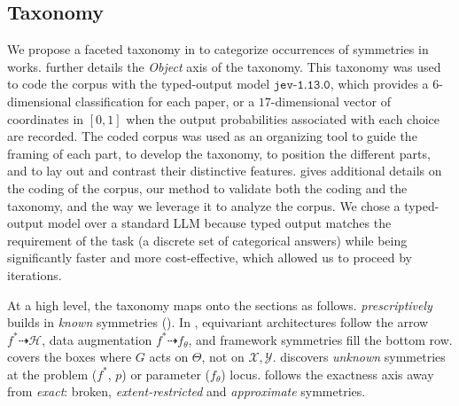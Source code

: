 \documentclass[mathematics,review,submit,moreauthors]{Definitions/mdpi}
\begin{document}
\subsection{Taxonomy}
We propose a faceted taxonomy in  to categorize occurrences of symmetries in works.
 further details the \emph{Object} axis of the taxonomy.
This taxonomy was used to code the corpus with the typed-output model $\texttt{jev-1.13.0}$, which provides a $6$-dimensional classification for each paper, or a $17$-dimensional vector of coordinates in $[0,1]$ when the output probabilities associated with each choice are recorded.
The coded corpus was used as an organizing tool to guide the framing of each part, to develop the taxonomy, to position the different parts, and to lay out and contrast their distinctive features.
 gives additional details on the coding of the corpus, our method to validate both the coding and the taxonomy, and the way we leverage it to analyze the corpus.
We chose a typed-output model over a standard LLM because typed output matches the requirement of the task (a discrete set of categorical answers) while being significantly faster and more cost-effective, which allowed us to proceed by iterations.

At a high level, the taxonomy maps onto the sections as follows.
 \emph{prescriptively} builds in \emph{known} symmetries ().
In , equivariant architectures follow the arrow $f^*\dashrightarrow\mathcal{H}$, data augmentation $f^*\dashrightarrow f_\theta$, and framework symmetries fill the bottom row.
 covers the boxes where $G$ acts on $\Theta$, not on $\mathcal{X},\mathcal{Y}$.
 discovers \emph{unknown} symmetries at the problem ($f^*$, $p$) or parameter ($f_\theta$) locus.
 follows the exactness axis away from \emph{exact}: broken, \emph{extent-restricted} and \emph{approximate} symmetries.
\end{document}
